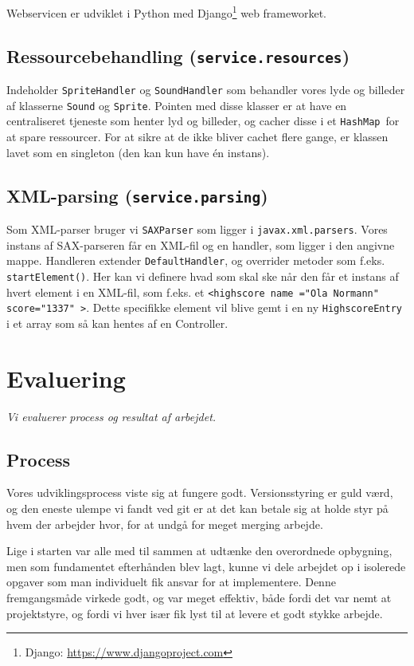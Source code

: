 \documentclass[titlepage,danish]{article}
\newcommand{\code}[1]{\texttt{#1}}
\begin{document}
Webservicen er udviklet i Python med Django\footnote{Django: \url{https://www.djangoproject.com}} web frameworket.

\subsection{Ressourcebehandling (\code{service.resources})}
Indeholder \code{SpriteHandler} og \code{SoundHandler} som behandler vores lyde og billeder af klasserne \code{Sound} og \code{Sprite}. Pointen med disse klasser er at have en centraliseret tjeneste som henter lyd og billeder, og cacher disse i et \code{HashMap}\ for at spare ressourcer. For at sikre at de ikke bliver cachet flere gange, er klassen lavet som en singleton (den kan kun have én instans).

\subsection{XML-parsing (\code{service.parsing})}
Som XML-parser bruger vi \code{SAXParser} som ligger i \code{javax.xml.parsers}. Vores instans af SAX-parseren får en XML-fil og en handler, som ligger i den angivne mappe. Handleren extender \code{DefaultHandler}, og overrider metoder som f.eks. \code{startElement()}. Her kan vi definere hvad som skal ske når den får et instans af hvert element i en XML-fil, som f.eks. et \code{\textless highscore name ="Ola Normann" score="1337" \textgreater}. Dette specifikke element vil blive gemt i en ny \code{HighscoreEntry} i et array som så kan hentes af en Controller.

\section{Evaluering}
\emph{Vi evaluerer process og resultat af arbejdet.}
\subsection{Process}
Vores udviklingsprocess viste sig at fungere godt. Versionsstyring er guld værd, og den eneste
ulempe vi fandt ved git er at det kan betale sig at holde styr på hvem der arbejder hvor, for at
undgå for meget merging arbejde.

Lige i starten var alle med til sammen at udtænke den overordnede opbygning, men som fundamentet
efterhånden blev lagt, kunne vi dele arbejdet op i isolerede opgaver som man individuelt fik ansvar
for at implementere. Denne fremgangsmåde virkede godt, og var meget effektiv, både fordi det var
nemt at projektstyre, og fordi vi hver især fik lyst til at levere et godt stykke arbejde.
\end{document}
